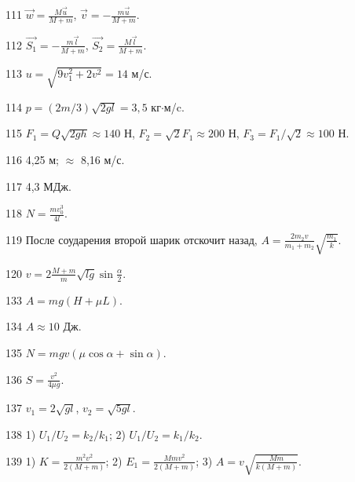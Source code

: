 \begin{Answer}{111}
$\vec{w} = \frac{M\vec{u}}{M+m}$, $\vec{v} = -\frac{m\vec{u}}{M+m}$.
\end{Answer}
\begin{Answer}{112}
$\vec{S_1} = -\frac{m\vec{l}}{M+m}$, $\vec{S_2} = \frac{M\vec{l}}{M+m}$.
\end{Answer}
\begin{Answer}{113}
$u = \sqrt{9v_{1}^2 + 2v^2} = 14$ м/с.
\end{Answer}
\begin{Answer}{114}
$p = (2m/3)\sqrt{2gl} = 3,5$ кг$\cdot$м/c.
\end{Answer}
\begin{Answer}{115}
$F_1 = Q\sqrt{2gh} \approx 140$ Н, $F_2 = \sqrt{2} F_1 \approx 200$ Н, $F_3 = F_1/\sqrt{2} \approx 100$ Н.
\end{Answer}
\begin{Answer}{116}
4,25 м; $\approx$ 8,16 м/с.
\end{Answer}
\begin{Answer}{117}
4,3 МДж.
\end{Answer}
\begin{Answer}{118}
$N =\frac{mv_{0}^3}{4l}$.
\end{Answer}
\begin{Answer}{119}
После соударения второй шарик отскочит назад, $A = \frac{2m_2v}{m_1+m_2}\sqrt{\frac{m_1}{k}}$.
\end{Answer}
\begin{Answer}{120}
$v = 2\frac{M+m}{m}\sqrt{lg}\sin \frac{\alpha}{2}$.
\end{Answer}
\begin{Answer}{133}
$A=mg(H+\mu L)$.
\end{Answer}
\begin{Answer}{134}
$A \approx 10$ Дж.
\end{Answer}
\begin{Answer}{135}
$N = mgv(\mu \cos \alpha +\sin \alpha)$.
\end{Answer}
\begin{Answer}{136}
$S = \frac{v^2}{4 \mu g}$.
\end{Answer}
\begin{Answer}{137}
$v_1 = 2\sqrt{gl}$, $v_2 = \sqrt{5gl}$.
\end{Answer}
\begin{Answer}{138}
1) $U_1/U_2 = k_2/k_1$; 2) $U_1/U_2 = k_1/k_2$.
\end{Answer}
\begin{Answer}{139}
1) $K=\frac{m^2v^2}{2(M+m)}$; 2) $E_1 = \frac{Mmv^2}{2(M+m)}$; 3) $A = v\sqrt{\frac{Mm}{k(M+m)}}$.
\end{Answer}
